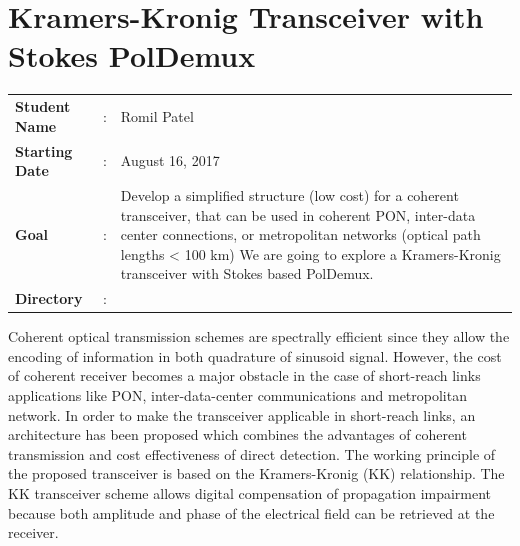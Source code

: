 \clearpage
\section{Kramers-Kronig Transceiver  with Stokes PolDemux}

\begin{tcolorbox}	
\begin{tabular}{p{2.75cm} p{0.2cm} p{10.5cm}} 	
\textbf{Student Name}  &:& Romil Patel\\
\textbf{Starting Date} &:& August 16, 2017\\
\textbf{Goal}          &:& Develop a simplified structure (low cost) for a coherent transceiver, that can be used in coherent PON, inter-data center connections, or metropolitan networks (optical path lengths < 100 km) We are going to explore a Kramers-Kronig transceiver with Stokes based PolDemux.\\
\textbf{Directory} 	   &:& 
\end{tabular}
\end{tcolorbox}

Coherent optical transmission schemes are spectrally efficient since they allow the encoding of information in both quadrature of sinusoid signal. However, the cost of coherent receiver becomes a major obstacle in the case of short-reach links applications like PON, inter-data-center communications and metropolitan network. In order to make the transceiver applicable in short-reach links, an architecture has been proposed which combines the advantages of coherent transmission and cost effectiveness of direct detection. The working principle of the proposed transceiver is based on the Kramers-Kronig (KK) relationship. The KK transceiver scheme allows digital compensation of propagation impairment because both amplitude and phase of the electrical field can be retrieved at the receiver. 
